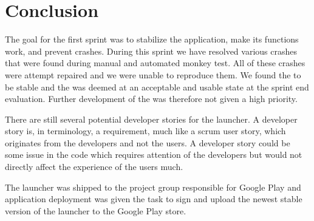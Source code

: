 
\chapter{Conclusion}
\label{cha:conclusion}

The goal for the first sprint was to stabilize the \launcher application, make its functions work, and prevent crashes. During this sprint we have resolved various crashes that were found during manual and automated monkey test. All of these crashes were attempt repaired and we were unable to reproduce them. We found the \launcher to be stable and the \launcher was deemed at an acceptable and usable state at the sprint end evaluation. Further development of the \launcher was therefore not given a high priority. 

There are still several potential developer stories for the launcher. A developer story is, in \giraf terminology, a requirement, much like a scrum user story, which originates from the developers and not the users. A developer story could be some issue in the code which requires attention of the developers but would not directly affect the experience of the users much.    


The launcher was shipped to the project group responsible for Google Play and application deployment was given the task to sign and upload the newest stable version of the launcher to the Google Play store. 







